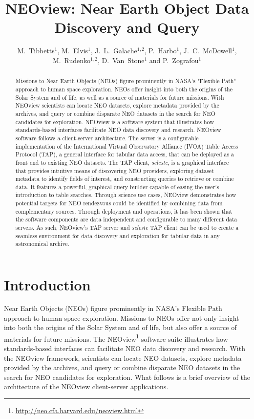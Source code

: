 \documentclass[11pt,twoside]{article}
\begin{document}
\title{NEOview: Near Earth Object Data Discovery and Query}
\author{M.~Tibbetts$^1$, M.~Elvis$^1$, J.~L.~Galache$^1$$^,$$^2$, P.~Harbo$^1$, J.~C.~McDowell$^1$, M.~Rudenko$^1$$^,$$^2$, D.~Van~Stone$^1$ and P.~Zografou$^1$}

\begin{abstract}
Missions to Near Earth Objects (NEOs) figure prominently in NASA's "Flexible Path" approach to human space exploration. NEOs offer insight into both the origins of the Solar System and of life, as well as a source of materials for future missions. With NEOview scientists can locate NEO datasets, explore metadata provided by the archives, and query or combine disparate NEO datasets in the search for NEO candidates for exploration.  NEOview is a software system that illustrates how standards-based interfaces facilitate NEO data discovery and research.  NEOview software follows a client-server architecture. The server is a configurable implementation of the International Virtual Observatory Alliance (IVOA) Table Access Protocol (TAP), a general interface for tabular data access, that can be deployed as a front end to existing NEO datasets. The TAP client, \textit{seleste}, is a graphical interface that provides intuitive means of discovering NEO providers, exploring dataset metadata to identify fields of interest, and constructing queries to retrieve or combine data. It features a powerful, graphical query builder capable of easing the user's introduction to table searches.  Through science use cases, NEOview demonstrates how potential targets for NEO rendezvous could be identified by combining data from complementary sources. Through deployment and operations, it has been shown that the software components are data independent and configurable to many different data servers. As such, NEOview's TAP server and \textit{seleste} TAP client can be used to create a seamless environment for data discovery and exploration for tabular data in any astronomical archive.
\end{abstract}

\section{Introduction}
Near Earth Objects (NEOs) figure prominently in NASA's Flexible Path approach to human space exploration\citep{flexible_path}.  Missions to NEOs offer not only insight into both the origins of the Solar System and of life, but also offer a source of materials for future missions.  The NEOview\footnote{\url{http://neo.cfa.harvard.edu/neoview.html}} software suite illustrates how standards-based interfaces can facilitate NEO data discovery and research.  With the NEOview framework, scientists can locate NEO datasets, explore metadata provided by the archives, and query or combine disparate NEO datasets in the search for NEO candidates for exploration.  What follows is a brief overview of the architecture of the NEOview client-server applications.
\end{document}
